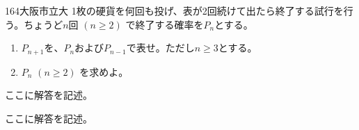 \begin{prob}{164}{}{大阪市立大}
 1枚の硬貨を何回も投げ、表が2回続けて出たら終了する試行を行う。ちょうど$n$回 $(n\ge 2)$ で終了する確率を$P_n$とする。
 \begin{enumerate}
  \item $P_{n+1}$を、$P_n$および$P_{n-1}$で表せ。ただし$n\ge 3$とする。
  \item $P_n$ $(n\ge 2)$ を求めよ。
 \end{enumerate}
\end{prob}
ここに解答を記述。

ここに解答を記述。